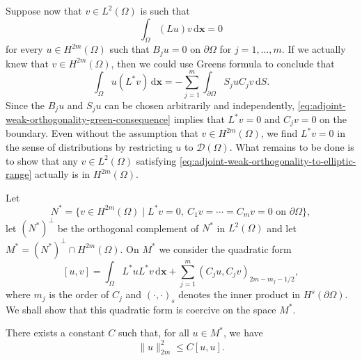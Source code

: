 Suppose now that $v\in L^2(\Omega)$ is such that
\begin{equation}\label{eq:adjoint-weak-orthogonality-to-elliptic-range}
\int_\Omega(Lu)v\,\mathrm{d}\bm{x}=0
\end{equation}
for every $u\in H^{2m}(\Omega)$ such that $B_ju=0$ on $\partial\Omega$ for $j=1,\ldots,m$. If we actually knew that $v\in H^{2m}(\Omega)$, then we could use Green\textquotesingle s formula to conclude that
\begin{equation}\label{eq:adjoint-weak-orthogonality-green-consequence}
\int_\Omega u(L^*v)\,\mathrm{d}\bm{x}=-\sum_{j=1}^m\int_{\partial\Omega}S_juC_jv\,\mathrm{d}S.
\end{equation}
Since the $B_ju$ and $S_ju$ can be chosen arbitrarily and independently, \eqref{eq:adjoint-weak-orthogonality-green-consequence} implies that $L^*v=0$ and $C_jv=0$ on the boundary. Even without the assumption that $v\in H^{2m}(\Omega)$, we find $L^*v=0$ in the sense of distributions by restricting $u$ to $\mathcal{D}(\Omega)$. What remains to be done is to show that any $v\in L^2(\Omega)$ satisfying \eqref{eq:adjoint-weak-orthogonality-to-elliptic-range} actually is in $H^{2m}(\Omega)$.

Let
\begin{equation}\label{eq:adjoint-homogeneous-boundary-nullspace}
N^*=\{v\in H^{2m}(\Omega)\mid L^*v=0,\ C_1v=\cdots=C_mv=0\text{ on }\partial\Omega\},
\end{equation}
let $(N^*)^\perp$ be the orthogonal complement of $N^*$ in $L^2(\Omega)$ and let $M^*=(N^*)^\perp\cap H^{2m}(\Omega)$. On $M^*$ we consider the quadratic form
\begin{equation}\label{eq:adjoint-auxiliary-quadratic-form}
[u,v]=\int_\Omega L^*uL^*v\,\mathrm{d}\bm{x}+\sum_{j=1}^m(C_ju,C_jv)_{2m-m_j-1/2},
\end{equation}
where $m_j$ is the order of $C_j$ and $(\cdot,\cdot)_s$ denotes the inner product in $H^s(\partial\Omega)$. We shall show that this quadratic form is coercive on the space $M^*$.

\begin{Lemma}
\label{lem:adjoint-auxiliary-form-complement-coercivity}
There exists a constant $C$ such that, for all $u\in M^*$, we have
\begin{equation}\label{eq:adjoint-auxiliary-form-complement-coercivity}
\|u\|_{2m}^2\leq C[u,u].
\end{equation}

\end{Lemma}

